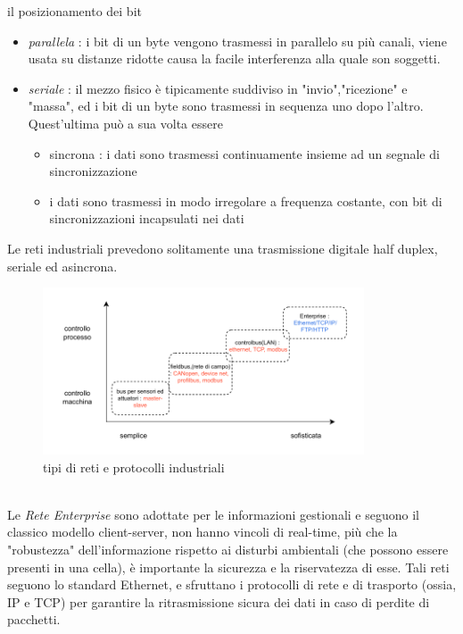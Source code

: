 \documentclass[10pt, letterpaper]{report}
\begin{document}
il posizionamento dei bit\begin{itemize}
    \item \textit{parallela} : i bit di un byte vengono trasmessi 
    in parallelo su più canali, viene usata su distanze ridotte causa la 
    facile interferenza alla quale son soggetti.
    \item \textit{seriale} : il mezzo fisico è tipicamente 
    suddiviso in "invio","ricezione" e "massa", ed i bit di un byte 
    sono trasmessi in sequenza uno dopo l'altro. Quest'ultima può 
    a sua volta essere\begin{itemize}
        \item sincrona : i dati sono trasmessi continuamente insieme 
        ad un segnale di sincronizzazione 
        \item i dati sono trasmessi in modo irregolare a frequenza costante, 
        con bit di sincronizzazioni incapsulati nei dati 
    \end{itemize}
\end{itemize}
Le reti industriali prevedono solitamente una trasmissione digitale 
half duplex, seriale ed asincrona.\\\begin{figure}[h!]
    \centering
    \includegraphics[width=0.85\textwidth ]{images/protocolliReti.pdf}
    \caption{tipi di reti e protocolli industriali}
\end{figure}\\
Le \textit{Rete Enterprise} sono adottate per le informazioni gestionali e seguono il classico 
modello client-server, non hanno vincoli di real-time, più che la "robustezza" dell'informazione rispetto 
ai disturbi ambientali (che possono essere presenti in una cella), è importante 
la sicurezza e la riservatezza di esse. Tali reti seguono lo standard Ethernet, e sfruttano i 
protocolli di rete e di trasporto (ossia, IP e TCP) per garantire la ritrasmissione sicura dei dati 
in caso di perdite di pacchetti.\acc 
\end{document}
